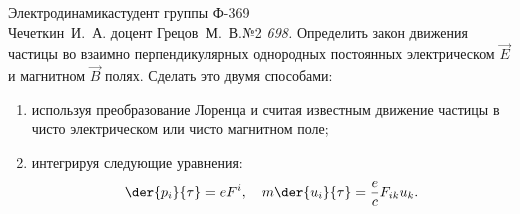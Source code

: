 




\usepackage{mathrsfs}

\renewcommand{\mid}[1]{\left\langle #1 \right\rangle}
\newcommand{\ds}{\displaystyle}
\newcommand{\inv}{\mathrm{inv}}
\renewcommand{\v}{\mathrm{v}}
\newcommand{\E}{\mathscr{E}}


{Электродинамика}{студент группы Ф-369\\Чечеткин~И.~А.}
{доцент Грецов~М.~В.}{№2}
\emph{698.} Определить закон движения частицы во взаимно перпендикулярных
однородных постоянных электрическом \( \vec{E} \) и магнитном \( \vec{B} \)
полях. Сделать это двумя способами:
\vspace*{-1em}
\begin{enumerate}\itemsep-.5em
    \item используя преобразование Лоренца и считая известным движение частицы в
    чисто электрическом или чисто магнитном поле;
    \item интегрируя следующие уравнения:
    \begin{equation}
        \der{p_i}{\tau} = eF^i, \quad
        m\der{u_i}{\tau} = \frac{e}{c}F_{ik}u_k.
        \label{eq:1_task}
    \end{equation}
\end{enumerate}

